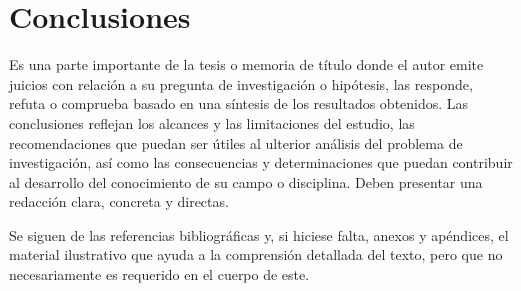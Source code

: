 \chapter{Conclusiones}

Es una parte importante de la tesis o memoria de título donde el autor emite juicios con relación a su
pregunta de investigación o hipótesis, las responde, refuta o comprueba basado en una síntesis de los
resultados obtenidos. Las conclusiones reflejan los alcances y las limitaciones del estudio, las
recomendaciones que puedan ser útiles al ulterior análisis del problema de investigación, así como las consecuencias y determinaciones que puedan contribuir al desarrollo del conocimiento de su campo o
disciplina. Deben presentar una redacción clara, concreta y directas.

Se siguen de las referencias bibliográficas y, si hiciese falta, anexos y apéndices, el material ilustrativo que ayuda a la comprensión detallada del texto, pero que no necesariamente es requerido en el cuerpo de este.
